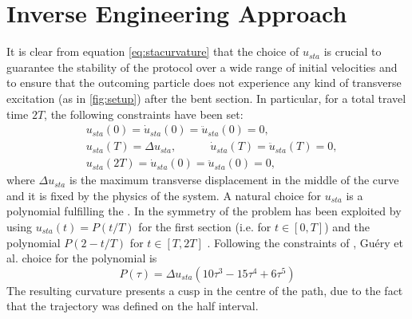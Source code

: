 \section{Inverse Engineering Approach}
 It is clear from equation \eqref{eq:stacurvature} that the choice of $ u_{sta} $ is crucial to guarantee the stability of the protocol over a wide range of initial velocities and to ensure that the outcoming particle does not experience any kind of transverse excitation (as in \cref{fig:setup}) after the bent section.
 In particular, for a total travel time $ 2T $, the following constraints have been set:
 \begin{align}
 &	u_{sta}(0) =\dot{u}_{sta}(0) = \ddot{u}_{sta}(0) = 0 , \label{eq:boundary0}\\
 &	u_{sta}(T) = \Delta u_{sta}, \hspace{3em } \dot{u}_{sta}(T) = \ddot{u}_{sta}(T) = 0, \label{eq:boundary1}\\
 &	u_{sta}(2T) =\dot{u}_{sta}(0) = \ddot{u}_{sta}(0) = 0, \label{eq:boundary2}
 \end{align}
 where $ \Delta u_{sta} $ is the maximum transverse displacement in the middle of the curve and it is fixed by the physics of the system.
 A natural choice for $u_{sta}$ is a polynomial fulfilling the .
 In \cite{QuantumControlImpens2020} the symmetry of the problem has been  exploited  by using $ u_{sta}(t)  = P(t/T)$ for the first section (i.e. for $ t \in [0,T]$) and the polynomial $ P(2-t/T) $ for $ t \in [T,2T] $ .
 Following the constraints of , Gu{\'e}ry et al. choice for the polynomial is 
 \begin{equation}
	 \label{eq:order1poly}
 	P(\tau) = \Delta u_{sta}(10\tau^3 - 15\tau^4 + 6\tau^5) 
 \end{equation}
The resulting curvature presents a cusp in the centre of the path, due to the fact that the trajectory was defined on the half interval.
